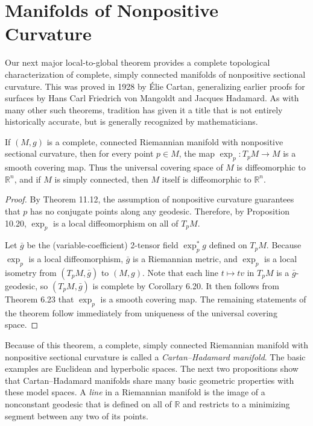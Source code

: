 \section{Manifolds of Nonpositive Curvature}

Our next major local-to-global theorem provides a complete topological characterization of complete, simply connected manifolds of nonpositive sectional curvature. This was proved in 1928 by Élie Cartan, generalizing earlier proofs for surfaces by Hans Carl Friedrich von Mangoldt and Jacques Hadamard. As with many other such theorems, tradition has given it a title that is not entirely historically accurate, but is generally recognized by mathematicians.

\begin{theorem}
\label{thm:cartan-hadamard}
If $(M, g)$ is a complete, connected Riemannian manifold with nonpositive sectional curvature, then for every point $p \in M$, the map $\exp_p : T_p M \to M$ is a smooth covering map. Thus the universal covering space of $M$ is diffeomorphic to $\mathbb{R}^n$, and if $M$ is simply connected, then $M$ itself is diffeomorphic to $\mathbb{R}^n$.
\end{theorem}

\begin{proof}
By Theorem 11.12, the assumption of nonpositive curvature guarantees that $p$ has no conjugate points along any geodesic. Therefore, by Proposition 10.20, $\exp_p$ is a local diffeomorphism on all of $T_p M$.

Let $\bar{g}$ be the (variable-coefficient) 2-tensor field $\exp_p^* g$ defined on $T_p M$. Because $\exp_p$ is a local diffeomorphism, $\bar{g}$ is a Riemannian metric, and $\exp_p$ is a local isometry from $(T_p M, \bar{g})$ to $(M, g)$. Note that each line $t \mapsto tv$ in $T_p M$ is a $\bar{g}$-geodesic, so $(T_p M, \bar{g})$ is complete by Corollary 6.20. It then follows from Theorem 6.23 that $\exp_p$ is a smooth covering map. The remaining statements of the theorem follow immediately from uniqueness of the universal covering space.
\end{proof}

Because of this theorem, a complete, simply connected Riemannian manifold with nonpositive sectional curvature is called a \emph{Cartan--Hadamard manifold}. The basic examples are Euclidean and hyperbolic spaces. The next two propositions show that Cartan--Hadamard manifolds share many basic geometric properties with these model spaces. A \emph{line} in a Riemannian manifold is the image of a nonconstant geodesic that is defined on all of $\mathbb{R}$ and restricts to a minimizing segment between any two of its points.

